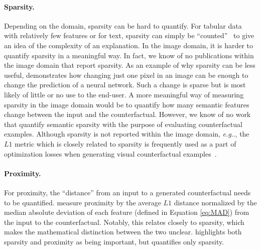 \documentclass[11pt,a4paper,twoside,openright,final]{memoir}
\makeatletter
\DeclareRobustCommand\onedot{\futurelet\@let@token\@onedot}
\def\@onedot{\ifx\@let@token.\else.\null\fi\xspace}
\def\eg{\emph{e.g}\onedot} \def\Eg{\emph{E.g}\onedot}
\makeatother
\begin{document}
\paragraph{Sparsity.}
Depending on the domain, sparsity can be hard to quantify.
For tabular data with relatively few features or for text, sparsity can simply be ``counted''~\cite{Kang2020, Laugel2018} to give an idea of the complexity of an explanation. 
In the image domain, it is harder to quantify sparsity in a meaningful way.
In fact, we know of no publications within the image domain that report sparsity.
As an example of why sparsity can be less useful, \cite{one-pixel-attack} demonstrates how changing just one pixel in an image can be enough to change the prediction of a neural network.
Such a change is sparse but is most likely of little or no use to the end-user.
A more meaningful way of measuring sparsity in the image domain would be to quantify how many semantic features change between the input and the counterfactual.
However, we know of no work that quantify semantic sparsity with the purpose of evaluating counterfactual examples.
Although sparsity is not reported within the image domain, \eg, the $L1$ metric which is closely related to sparsity is frequently used as a part of optimization losses when generating visual counterfactual examples~\cite{VanLooveren2019, Dhurandhar2018, Wachter2017, Singla2019}. 

\paragraph{Proximity.}
For proximity, the ``distance'' from an input to a generated counterfactual needs to be quantified.
\citet{Mothilal2020} measure proximity by the average $L1$ distance normalized by the median absolute deviation of each feature (defined in Equation \eqref{eq:MAD}) from the input to the counterfactual. 
Notably, this relates closely to sparsity, which makes the mathematical distinction between the two unclear.
\cite{Mothilal2020} highlights both sparsity and proximity as being important, but quantifies only sparsity.
\end{document}
